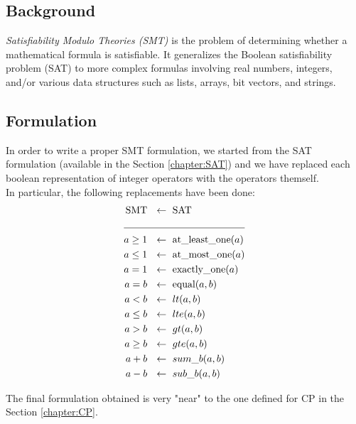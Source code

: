 
\subsection{Background}
    \textit{Satisfiability Modulo Theories (SMT)} is the problem of determining whether a
    mathematical formula is satisfiable. It generalizes the Boolean satisfiability problem (SAT) to
    more complex formulas involving real numbers, integers, and/or various data structures such as 
    lists, arrays, bit vectors, and strings.


\subsection{Formulation} \label{subsec:SMT_formulation}
    In order to write a proper SMT formulation, we started from the SAT formulation (available in
    the Section \ref{chapter:SAT}) and we have replaced each boolean representation of integer 
    operators with the operators themself.\\

    In particular, the following replacements have been done:
    \begin{align*}
      \text{SMT} \ &\ \leftarrow\ \text{SAT}      \\
                 \cline{1-2}
        a \geq 1 \ &\ \leftarrow\ \text{at\_least\_one}(a) \\
        a \leq 1 \ &\ \leftarrow\ \text{at\_most\_one}(a)  \\
           a = 1 \ &\ \leftarrow\ \text{exactly\_one}(a)   \\
           a = b \ &\ \leftarrow\ \text{equal}(a,b)        \\
           a < b \ &\ \leftarrow\ lt(a,b)                  \\
        a \leq b \ &\ \leftarrow\ lte(a,b)                 \\
           a > b \ &\ \leftarrow\ gt(a,b)                  \\
        a \geq b \ &\ \leftarrow\ gte(a,b)                 \\
           a + b \ &\ \leftarrow\ sum\_b(a,b)              \\   
           a - b \ &\ \leftarrow\ sub\_b(a,b)                 
    \end{align*}

    The final formulation obtained is very "near" to the one defined for CP in the
    Section \ref{chapter:CP}.

